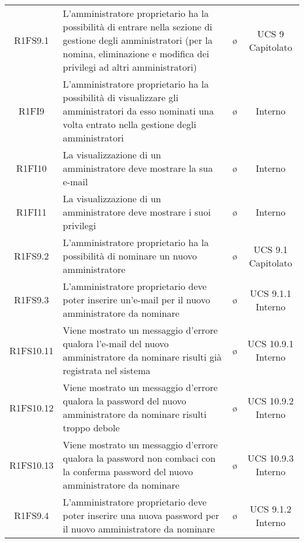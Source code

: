 {\begin{longtable}{ c C{4cm} c c}



R1FS9.1 & L'amministratore proprietario ha la possibilità di entrare nella sezione di gestione degli amministratori (per la nomina, eliminazione e modifica dei privilegi ad altri amministratori) & \o & UCS 9 Capitolato \\

R1FI9 & L'amministratore proprietario ha la possibilità di visualizzare gli amministratori da esso nominati una volta entrato nella gestione degli amministratori & \o & Interno \\

R1FI10 & La visualizzazione di un amministratore deve mostrare la sua e-mail & \o & Interno \\

R1FI11 & La visualizzazione di un amministratore deve mostrare i suoi privilegi & \o & Interno \\

R1FS9.2 & L'amministratore proprietario ha la possibilità di nominare un nuovo amministratore & \o & UCS 9.1 Capitolato\\

R1FS9.3 & L'amministratore proprietario deve poter inserire un'e-mail per il nuovo amministratore da nominare & \o & UCS 9.1.1 Interno\\

R1FS10.11 & Viene mostrato un messaggio d'errore qualora l'e-mail del nuovo amministratore da nominare risulti già registrata nel sistema & \o & UCS 10.9.1 Interno\\

R1FS10.12 & Viene mostrato un messaggio d'errore qualora la password del nuovo amministratore da nominare risulti troppo debole & \o & UCS 10.9.2 Interno\\

R1FS10.13 & Viene mostrato un messaggio d'errore qualora la password non combaci con la conferma password del nuovo amministratore da nominare & \o & UCS 10.9.3 Interno\\

R1FS9.4 & L'amministratore proprietario deve poter inserire una nuova password per il nuovo amministratore da nominare & \o & UCS 9.1.2 Interno\\


\end{longtable}}
